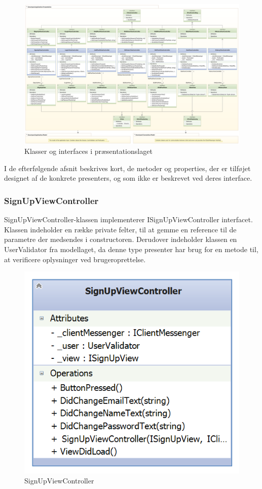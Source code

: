 \begin{landscape}
\begin{figure}
	\centering
	\includegraphics[width=1\linewidth]{figs/design/application_presentation_full}
	\caption{Klasser og interfaces i præsentationslaget}
	\label{fig:application_presentation_full}
\end{figure}
\end{landscape}

I de efterfølgende afsnit beskrives kort, de metoder og properties, der er tilføjet designet af de konkrete presenters, og som ikke er beskrevet ved deres interface.

\subsubsection{SignUpViewController}
SignUpViewController-klassen implementerer ISignUpViewController interfacet. Klassen indeholder en række private felter, til at gemme en reference til de parametre der medsendes i constructoren. Derudover indeholder klassen en UserValidator fra modellaget, da denne type presenter har brug for en metode til, at verificere oplysninger ved brugeroprettelse.

\begin{figure}
	\centering
	\includegraphics[width=0.3\linewidth]{figs/design/application_signupviewcontroller}
	\caption{SignUpViewController}
	\label{fig:application_signupviewcontroller}
\end{figure}

